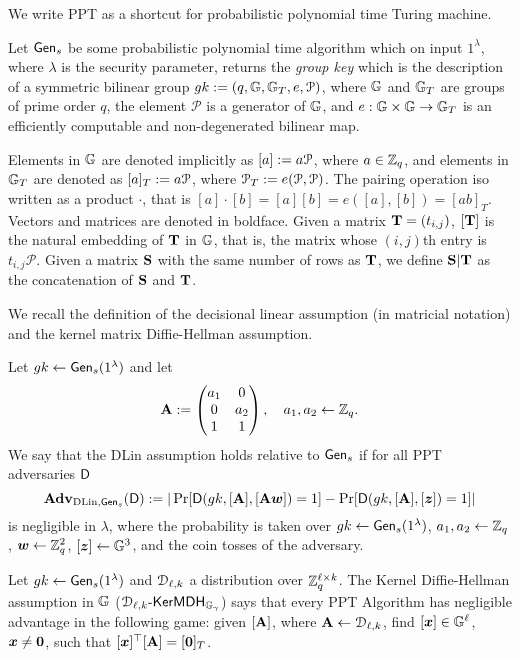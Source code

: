 We write PPT as a shortcut for probabilistic polynomial time Turing machine.

Let $\mathsf{Gen}_s$ be some probabilistic polynomial time algorithm which on input $1^{\lambda}$, where $\lambda$ is the security parameter, returns the \emph{group key} which is the description of a symmetric bilinear group $gk:=(q,\mathbb{G},\mathbb{G}_T,e,\mathcal{P})$, where $\mathbb{G}$
and $\mathbb{G}_T$ are groups of prime order $q$, the element $\mathcal{P}$ is a generator of 
$\mathbb{G}$, and $e:\mathbb{G}\times\mathbb{G}\to\mathbb{G}_T$ is an efficiently computable and non-degenerated bilinear map.

Elements in $\mathbb{G}$ are denoted implicitly as $[a]:=a \mathcal{P}$, where $a\in\mathbb{Z}_q$, and elements in $\mathbb{G}_T$ are denoted as $[a]_T:=a\mathcal{P}$, where $\mathcal{P}_T:=e(\mathcal{P},\mathcal{P})$. 
The pairing operation iso written as a product $\cdot$, that is $[a] \cdot [b]=[a] [b]=e([a],[b])=[ab]_T$. Vectors and matrices are denoted in boldface. Given a matrix $\mathbf{{T}}=(t_{i,j})$, $[\mathbf{{T}}]$ is
the natural embedding of $\mathbf{{T}}$ in $\mathbb{G}$, that is, the matrix whose $(i,j)$th entry is $t_{i,j}\mathcal{P}$. Given a matrix $\mathbf{{S}}$ with the same number of rows as $\mathbf{{T}}$, we define $\mathbf{{S}}|\mathbf{{T}}$ as the concatenation of $\mathbf{{S}}$ and $\mathbf{{T}}$.

We recall the definition of the decisional linear assumption (in matricial notation) and the kernel matrix Diffie-Hellman assumption.

\begin{definition}\label{def:dlin}
 Let  ${gk} 
\gets \mathsf{Gen}_s(1^\lambda)$ and let
$$
\mathbf{{A}} :=
\begin{pmatrix} 
a_1 & 0     \\
0     & a_2 \\
1     &  1
\end{pmatrix},
\quad
a_1,a_2\gets\mathbb{Z}_q.
$$
We say that the DLin assumption holds relative to $\mathsf{Gen}_s$ if for all PPT adversaries $\mathsf{D}$
$$
\mathbf{Adv}_{\mathrm{DLin},\mathsf{Gen}_s}(\mathsf{D}) := |
	\Pr[
		\mathsf{D}(
			gk,
			[\mathbf{{A}}],
			[\mathbf{{A}}{\boldsymbol{w}}])=1]
	-\Pr[
		\mathsf{D}(
		gk,
		[\mathbf{{A}}],
		[{\boldsymbol{z}}])=1]|
$$
is negligible in $\lambda$, where the probability is taken over $gk\gets\mathsf{Gen}_s(1^\lambda)$, $a_1,a_2\gets\mathbb{Z}_q$, ${\boldsymbol{w}}\gets\mathbb{Z}_q^2$, $[{\boldsymbol{z}}]\gets\mathbb{G}^3$, and the coin tosses of the adversary. 
\end{definition}

\begin{definition} Let  ${gk} 
\gets\mathsf{Gen}_s(1^\lambda)$ and $\mathcal{D}_{\ell,k}$ a distribution over $\mathbb{Z}_q^{\ell\times k}$.
The Kernel Diffie-Hellman assumption in $\mathbb{G}$ ($\mathcal{D}_{\ell,k}\mbox{-}\mathsf{KerMDH}_{\mathbb{G}_\gamma}$) says that every PPT Algorithm has negligible advantage in the following  game: given $[\mathbf{{A}}]$, where $\mathbf{{A}} \gets \mathcal{D}_{\ell,k}$, find $[{\boldsymbol{x}}] \in \mathbb{G}^{\ell}$, ${\boldsymbol{x}} \neq {\boldsymbol{0}}$, such that 
$[{\boldsymbol{x}}]^{\top}[\mathbf{{A}}]=[{\boldsymbol{0}}]_T$. 
\end{definition}

